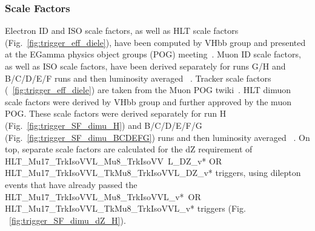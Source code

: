 

\subsubsection{Scale Factors}

Electron ID and ISO scale factors, as well as HLT scale factors (Fig.~\ref{fig:trigger_eff_diele}), have been computed by VHbb group and presented at the EGamma physics object groups (POG) meeting~\cite{egSF}.
Muon ID scale factors, as well as ISO scale factors, have been derived separately for runs G/H and B/C/D/E/F runs and then luminosity averaged ~\cite{muonIDnISO}. Tracker scale factors (~\ref{fig:trigger_eff_diele}) are taken from the Muon POG twiki~\cite{muonTRK}. HLT dimuon scale factors were derived by VHbb group and further approved by the muon POG. These scale factors were derived separately for run H (Fig.~\ref{fig:trigger_SF_dimu_H}) and B/C/D/E/F/G (Fig.~\ref{fig:trigger_SF_dimu_BCDEFG}) runs and then luminosity averaged ~\cite{muonTrigger}. On top, separate scale factors are calculated for the dZ requirement of HLT\_Mu17\_TrkIsoVVL\_Mu8\_TrkIsoVV\
L\_DZ\_v* OR HLT\_Mu17\_TrkIsoVVL\_TkMu8\_TrkIsoVVL\_DZ\_v* triggers, using dilepton events that have already passed the HLT\_Mu17\_TrkIsoVVL\_Mu8\_TrkIsoVVL\_v*\
 OR HLT\_Mu17\_TrkIsoVVL\_TkMu8\_TrkIsoVVL\_v* triggers (Fig. ~\ref{fig:trigger_SF_dimu_dZ_H}).

